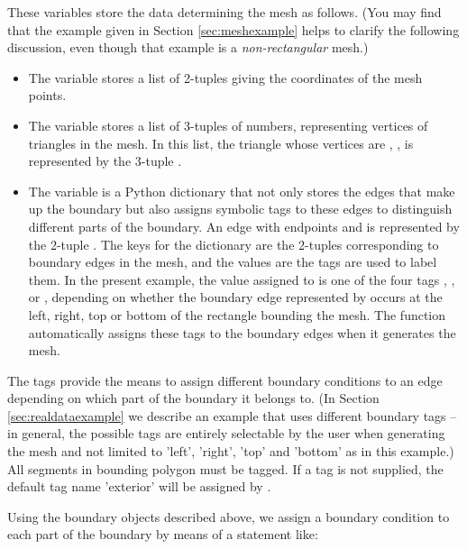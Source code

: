 \documentclass{manual}
\begin{document}
These variables store the data determining the mesh as follows. (You
may find that the example given in Section \ref{sec:meshexample}
helps to clarify the following discussion, even though that example
is a \emph{non-rectangular} mesh.)
\begin{itemize}
    \item The variable  stores a list of 2-tuples giving the
          coordinates of the mesh points.
    \item The variable  stores a list of 3-tuples of
          numbers, representing vertices of triangles in the mesh. In this
          list, the triangle whose vertices are ,
          ,  is represented by the 3-tuple
          .
    \item The variable  is a Python dictionary that
          not only stores the edges that make up the boundary but also assigns
          symbolic tags to these edges to distinguish different parts of the
          boundary. An edge with endpoints  and
           is represented by the 2-tuple . The
          keys for the dictionary are the 2-tuples  corresponding
          to boundary edges in the mesh, and the values are the tags are used
          to label them. In the present example, the value 
          assigned to \code{(i, j)]} is one of the four tags
          , ,  or ,
          depending on whether the boundary edge represented by 
          occurs at the left, right, top or bottom of the rectangle bounding
          the mesh. The function  automatically assigns
          these tags to the boundary edges when it generates the mesh.
\end{itemize}

The tags provide the means to assign different boundary conditions
to an edge depending on which part of the boundary it belongs to.
(In Section \ref{sec:realdataexample} we describe an example that
uses different boundary tags -- in general, the possible tags are entirely selectable by the user when generating the mesh and not
limited to 'left', 'right', 'top' and 'bottom' as in this example.)
All segments in bounding polygon must be tagged. If a tag is not supplied, the default tag name 'exterior' will be assigned by \anuga.

Using the boundary objects described above, we assign a boundary
condition to each part of the boundary by means of a statement like:
\end{document}
